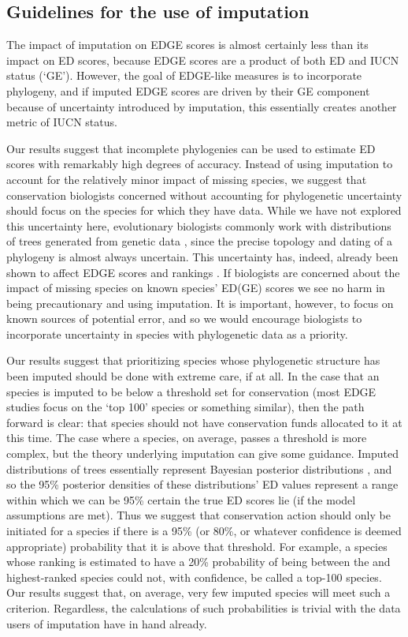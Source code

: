 \documentclass[10pt,english]{article}
\begin{document}
\subsection*{Guidelines for the use of imputation}
The impact of imputation on EDGE scores is almost certainly less than its impact
on ED scores, because EDGE scores are a product of both ED and IUCN status
(‘GE'). However, the goal of EDGE-like measures is to incorporate phylogeny, and
if imputed EDGE scores are driven by their GE component because of uncertainty
introduced by imputation, this essentially creates another metric of IUCN
status.

Our results suggest that incomplete phylogenies can be used to estimate ED
scores with remarkably high degrees of accuracy. Instead of using imputation to
account for the relatively minor impact of missing species, we suggest that
conservation biologists concerned without accounting for phylogenetic uncertainty
should focus on the species for which they have data. While we have not explored this
uncertainty here, evolutionary biologists commonly work with distributions of
trees generated from genetic data \autocite[reviewed in][]{Huelsenbeck2001,
Bollback2005}, since the precise topology and dating of a phylogeny is almost
always uncertain. This uncertainty has, indeed, already been shown to affect
EDGE scores and rankings \autocite{Pearse2015}.
If biologists are concerned about the impact of missing species on known species'
ED(GE) scores we see no harm in being precautionary and using imputation. It is
important, however, to focus on known sources of potential error,
and so we would encourage biologists to incorporate uncertainty in species
with phylogenetic data as a priority.

Our results suggest that prioritizing species whose phylogenetic structure has
been imputed should be done with extreme care, if at all. In the case that an
species is imputed to be below a threshold set for conservation (most
EDGE studies focus on the ‘top 100' species or something similar), then the path
forward is clear: that species should not have conservation funds allocated to
it at this time. The case where a species, on average, passes a threshold is
more complex, but the theory underlying imputation can give some guidance.
Imputed distributions of trees essentially represent Bayesian posterior
distributions \autocite{Kuhn2011}, and so the 95\% posterior densities of these
distributions' ED values represent a range within which we can be 95\% certain
the true ED scores lie (if the model assumptions are met). Thus we suggest that
conservation action should only be initiated for a species if there is a 95\%
(or 80\%, or whatever confidence is deemed appropriate) probability that it is
above that threshold. For example, a species whose ranking is estimated to have a 20\%
probability of being between the  and  highest-ranked species
could not, with confidence, be called a top-100 species. Our results suggest
that, on average, very few imputed species will meet such a criterion.
Regardless, the calculations of such probabilities is trivial with the data
users of imputation have in hand already.
\end{document}
